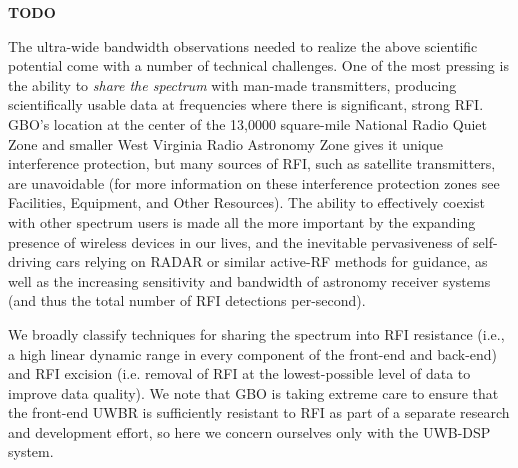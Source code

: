 \documentclass[10pt]{myNSF}
\begin{document}
 \textbf{TODO}

\label{sec:technical_motivation}

The ultra-wide bandwidth observations needed to realize the above
scientific potential come with a number of technical challenges.  One
of the most pressing is the ability to \emph{share the spectrum} with
man-made transmitters, producing scientifically usable data at
frequencies where there is significant, strong RFI.  GBO's location at
the center of the 13,0000 square-mile National Radio Quiet Zone and
smaller West Virginia Radio Astronomy Zone gives it unique
interference protection, but many sources of RFI, such as satellite
transmitters, are unavoidable (for more information on these
interference protection zones see Facilities, Equipment, and Other
Resources).  The ability to effectively coexist with other spectrum
users is made all the more important by the expanding presence of
wireless devices in our lives, and the inevitable pervasiveness of
self-driving cars relying on RADAR or similar active-RF methods for
guidance, as well as the increasing sensitivity and bandwidth of
astronomy receiver systems (and thus the total number of RFI
detections per-second).

We broadly classify techniques for sharing the spectrum into RFI
resistance (i.e., a high linear dynamic range in every component of
the front-end and back-end) and RFI excision (i.e. removal of RFI at
the lowest-possible level of data to improve data quality).  We note
that GBO is taking extreme care to ensure that the front-end UWBR is
sufficiently resistant to RFI as part of a separate research and
development effort, so here we concern ourselves only with the UWB-DSP
system.
\end{document}
